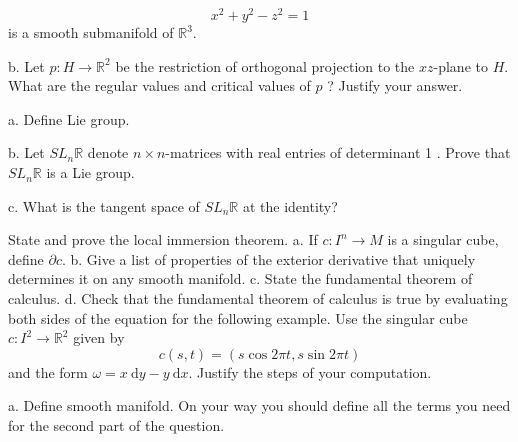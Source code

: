 \documentclass[14pt]{extarticle}
\begin{document}
$$
x^{2}+y^{2}-z^{2}=1
$$
is a smooth submanifold of $\mathbb{R}^{3}$.

b. Let $p: H \rightarrow \mathbb{R}^{2}$ be the restriction of orthogonal projection to the $x z$-plane to $H$. What are the regular values and critical values of $p$ ? Justify your answer.

\newpage
a. Define Lie group.

b. Let $S L_{n} \mathbb{R}$ denote $n \times n$-matrices with real entries of determinant 1 . Prove that $S L_{n} \mathbb{R}$ is a Lie group.

c. What is the tangent space of $S L_{n} \mathbb{R}$ at the identity?

\newpage
State and prove the local immersion theorem.
\newpage
a. If $c: I^{n} \rightarrow M$ is a singular cube, define $\partial c$.
b. Give a list of properties of the exterior derivative that uniquely determines it on any smooth manifold.
c. State the fundamental theorem of calculus.
d. Check that the fundamental theorem of calculus is true by evaluating both sides of the equation for the following example. Use the singular cube $c: I^{2} \rightarrow \mathbb{R}^{2}$ given by
$$
c(s, t)=(s \cos 2 \pi t, s \sin 2 \pi t)
$$
and the form $\omega=x \mathrm{~d} y-y \mathrm{~d} x$. Justify the steps of your computation.

\newpage
a. Define smooth manifold. On your way you should define all the terms you need for the second part of the question.
\end{document}

